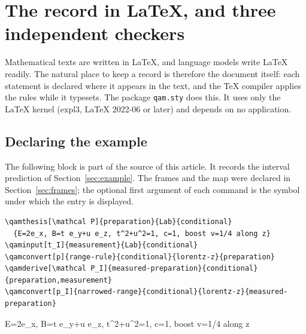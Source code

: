 \section{The record in \LaTeX, and three independent checkers}\label{sec:latex}

Mathematical texts are written in \LaTeX, and language models write \LaTeX{} readily. The natural place to keep a record is therefore the
document itself: each statement is declared where it appears in the text, and the \TeX{} compiler applies the rules while it typesets.
The package \texttt{qam.sty} does this. It uses only the \LaTeX{} kernel (expl3, \LaTeX{} 2022-06 or later) and depends on no
application.

\subsection{Declaring the example}

The following block is part of the source of this article. It records the interval prediction of Section~\ref{sec:example}. The frames
and the map were declared in Section~\ref{sec:frames}; the optional first argument of each command is the symbol under which the entry
is displayed.

\begin{lstlisting}
\qamthesis[\mathcal P]{preparation}{Lab}{conditional}
  {E=2e_x, B=t e_y+u e_z, t^2+u^2=1, c=1, boost v=1/4 along z}
\qaminput[t_I]{measurement}{Lab}{conditional}
\qamconvert[p]{range-rule}{conditional}{lorentz-z}{preparation}
\qamderive[\mathcal P_I]{measured-preparation}{conditional}{preparation,measurement}
\qamconvert[p_I]{narrowed-range}{conditional}{lorentz-z}{measured-preparation}
\end{lstlisting}
  {E=2e_x, B=t e_y+u e_z, t^2+u^2=1, c=1, boost v=1/4 along z}


